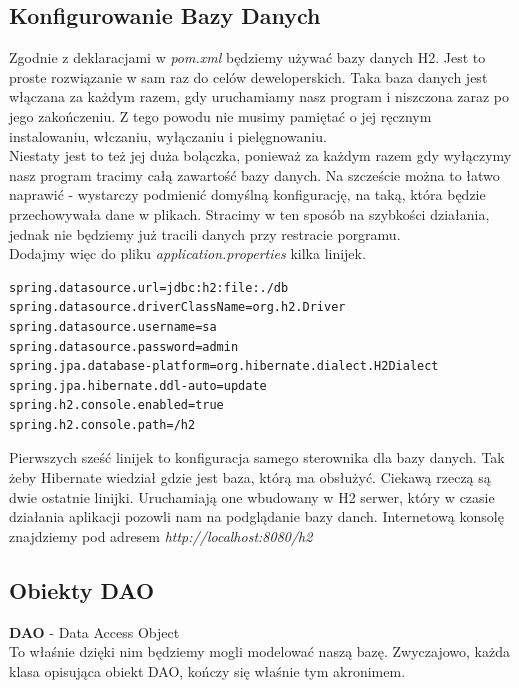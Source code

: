 \documentclass{article}
\begin{document}
        \subsection{Konfigurowanie Bazy Danych}
            Zgodnie z deklaracjami w \emph{pom.xml} będziemy używać bazy danych H2. Jest to proste rozwiązanie w sam raz do celów deweloperskich. Taka baza danych jest włączana za każdym razem, gdy uruchamiamy nasz program i niszczona zaraz po jego zakończeniu. Z tego powodu nie musimy pamiętać o jej ręcznym instalowaniu, włczaniu, wyłączaniu i pielęgnowaniu. \\
            Niestaty jest to też jej duża bolączka, ponieważ za każdym razem gdy wyłączymy nasz program tracimy całą zawartość bazy danych. Na szczeście można to łatwo naprawić - wystarczy podmienić domyślną konfigurację, na taką, która będzie przechowywała dane w plikach. Stracimy w ten sposób na szybkości działania, jednak nie będziemy już tracili danych przy restracie porgramu. \\
            Dodajmy więc do pliku \emph{application.properties} kilka linijek.
            \begin{verbatim}
spring.datasource.url=jdbc:h2:file:./db
spring.datasource.driverClassName=org.h2.Driver
spring.datasource.username=sa
spring.datasource.password=admin
spring.jpa.database-platform=org.hibernate.dialect.H2Dialect
spring.jpa.hibernate.ddl-auto=update
spring.h2.console.enabled=true
spring.h2.console.path=/h2
            \end{verbatim}
            Pierwszych sześć linijek to konfiguracja samego sterownika dla bazy danych. Tak żeby Hibernate wiedział gdzie jest baza, którą ma obsłużyć. Ciekawą rzeczą są dwie ostatnie linijki. Uruchamiają one wbudowany w H2 serwer, który w czasie działania aplikacji pozowli nam na podglądanie bazy danch. Internetową konsolę znajdziemy pod adresem \emph{http://localhost:8080/h2}
        
        \subsection{Obiekty DAO}
            \textbf{DAO} - Data Access Object \\
            To właśnie dzięki nim będziemy mogli modelować naszą bazę. Zwyczajowo, każda klasa opisująca obiekt DAO, kończy się właśnie tym akronimem. 
\end{document}
